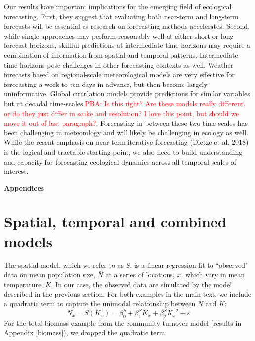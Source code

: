 \documentclass[11pt]{article}
\newcommand{\comment}{\textcolor{red}}
\begin{document}
Our results have important implications for the emerging field of ecological forecasting. First, they suggest that evaluating both near-term and long-term
forecasts will be essential as research on forecasting methods accelerates. Second, while single approaches may perform reasonably well at either short or long forecast horizons, skillful predictions at intermediate time horizons may require a combination of information from spatial and temporal patterns. Intermediate time horizons pose challenges in other forecasting contexts as well. Weather forecasts based on regional-scale meteorological models are very effective for forecasting a week to ten days in advance, but then become largely uninformative. Global circulation models provide predictions for similar variables but at decadal time-scales \comment{PBA: Is this right? Are these models really different, or do they just differ in scake and resolution? I love this point, but should we move it out of last paragraph?}. Forecasting in between these two time scales has been challenging in meteorology and will likely be challenging in ecology as well. While the recent emphasis on near-term iterative forecasting (Dietze et al. 2018) is the logical and tractable starting point, we also need to build understanding and capacity for forecasting ecological dynamics across all temporal scales of interest.

\newpage
\renewcommand{\refname}{Literature cited}





\clearpage 
\newpage 

\setcounter{page}{1}
\setcounter{equation}{0}
\setcounter{figure}{0}
\setcounter{section}{0}
\setcounter{table}{0}

\centerline{\Large \textbf{Appendices}}

\renewcommand{\thesection}{\Alph{section}}

\section{Spatial, temporal and combined models}\label{models}

The spatial model, which we refer to as $S$, is a linear regression fit to ``observed" data on mean population size, $\bar{N}$ at a series of locations, $x$, which vary in mean temperature, $K$. In our case, the observed data are simulated by the model described in the previous section. For both examples in the main text, we include a quadratic term to capture the unimodal relationship between  $\bar{N}$ and $K$:
 \begin{equation}
 \bar{N}_x = S(K_x) = \beta^S_0 +  \beta^S_1 K_x +\beta^S_2 {K_x}^2 + \varepsilon
 \label{eqn:spatial_regression}
 \end{equation}
For the total biomass example from the community turnover model (results in Appendix \ref{biomass}), we dropped the quadratic term.
\end{document}
